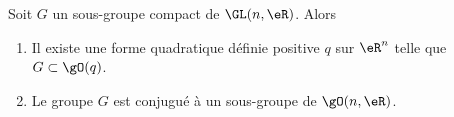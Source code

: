 \begin{proposition}     \label{PropQZkeHeG}
    Soit \( G\) un sous-groupe compact de \( \GL(n,\eR)\). Alors 
    \begin{enumerate}
        \item
            Il existe une forme quadratique définie positive \( q\) sur \( \eR^n\) telle que \( G\subset \gO(q)\).
        \item
            Le groupe \( G\) est conjugué à un sous-groupe de \( \gO(n,\eR)\).
    \end{enumerate}
\end{proposition}

